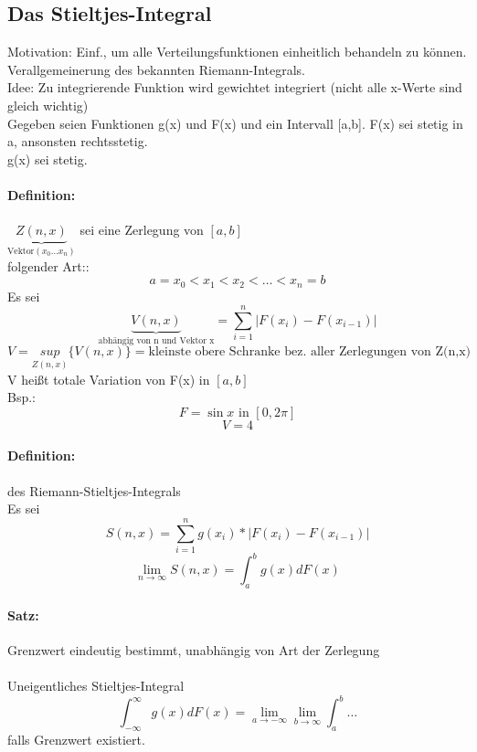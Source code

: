 \documentclass[a4paper,12pt]{scrartcl}
\begin{document}
\subsection{Das Stieltjes-Integral}

Motivation: Einf., um alle Verteilungsfunktionen einheitlich behandeln zu können. Verallgemeinerung des bekannten Riemann-Integrals.\\
Idee: Zu integrierende Funktion wird \glqq{}gewichtet\grqq{} integriert (nicht alle x-Werte sind gleich wichtig)\\
Gegeben seien Funktionen g(x) und F(x) und ein Intervall [a,b]. F(x) sei stetig in a, ansonsten rechtsstetig.\\
g(x) sei stetig.

\paragraph{Definition:} $\underbrace{Z(n,x)}_{\text{Vektor}(x_0\dots x_n)}$ sei eine Zerlegung von $[a,b]$\\
folgender Art::
$$a=x_0<x_1<x_2<\dots<x_n=b$$
Es sei
$$ \underbrace{V(n,x)}_{\text{abhängig von n und Vektor x}} = \sum^n_{i=1}|F(x_i)-F(x_{i-1})|$$
$$ V = \underset{Z(n,x)}{sup}\{V(n,x)\}=\text{kleinste obere Schranke bez. aller Zerlegungen von Z(n,x)}$$
V heißt totale Variation von F(x) in $[a,b]$\\
Bsp.:
$$F = \sin x \text{ in }[0,2\pi]$$
$$V=4$$
\paragraph{Definition:} des Riemann-Stieltjes-Integrals\\
Es sei
$$S(n,x) = \sum_{i=1}^n g(x_i) * |F(x_i) - F(x_{i-1})|$$
$$\lim_{n\rightarrow\infty} S(n,x) = \int^b_a g(x) dF(x) $$
\paragraph{Satz:} Grenzwert eindeutig bestimmt, unabhängig von Art der Zerlegung\\
\\
Uneigentliches Stieltjes-Integral
$$\int^\infty_{-\infty}g(x)dF(x) = \lim_{a\rightarrow-\infty}\lim_{b\rightarrow\infty}\int^{b}_{a}\dots $$
falls Grenzwert existiert.\\
\end{document}

